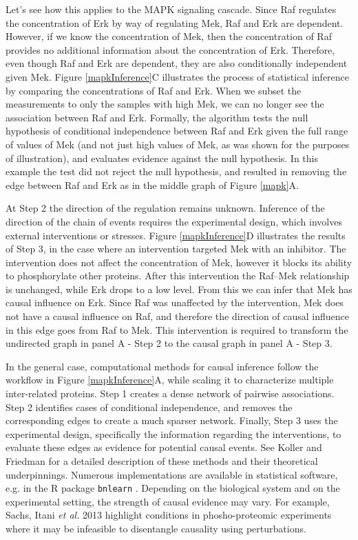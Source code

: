 \documentclass[journal=jacsat,manuscript=article]{achemso}
\def\added#1{{\color{blue} #1}}
\begin{document}
Let's see how this applies to the MAPK signaling cascade. \added{Since Raf regulates the concentration of Erk by way of regulating Mek, Raf and Erk are dependent.  However, if we know the concentration of Mek, then the concentration of Raf provides no additional information about the concentration of Erk. Therefore, even though Raf and Erk are dependent, they are also conditionally independent given Mek.  }  Figure \ref{mapkInference}C illustrates the process of statistical inference by comparing the concentrations of Raf and Erk. When we subset the measurements to only the samples with high Mek, we can no longer see the association between Raf and Erk. \added{Formally, the algorithm tests the null hypothesis of conditional independence between Raf and Erk given the full range of values of Mek (and not just high values of Mek, as was shown for the purposes of illustration), and evaluates evidence against the null hypothesis\cite{spirtes2000causation}. In this example the test did not reject the null hypothesis, and resulted in removing the edge between Raf and Erk as in the middle graph of Figure \ref{mapk}A. }

At Step 2 the direction of the regulation remains unknown. Inference of the direction of the chain of events requires the experimental design, which involves external interventions or stresses. Figure \ref{mapkInference}D illustrates the results of Step 3, in the case where an intervention targeted Mek with an inhibitor. The intervention does not affect the concentration of Mek, however it blocks its ability to phosphorylate other proteins.  After this intervention the Raf--Mek relationship is unchanged, while Erk drops to a low level.  From this we can infer that Mek has causal influence on Erk. Since Raf was unaffected by the intervention, Mek does not have a causal influence on Raf, and therefore the direction of causal influence in this edge goes from Raf to Mek.  This intervention is required to transform the undirected graph in panel A - Step 2 to the causal graph in panel A - Step 3.

In the general case, computational methods for causal inference follow the workflow in Figure \ref{mapkInference}A, while scaling it to characterize multiple inter-related proteins. Step 1 creates a dense network of pairwise associations. \added{Step 2 identifies cases of conditional independence, and removes the corresponding edges to create a much sparser network.}  Finally, Step 3 uses the experimental design, specifically the information regarding the interventions, to evaluate these edges as evidence for potential causal events. See Koller and Friedman \cite{koller2009probabilistic} for a detailed description of these methods and their theoretical underpinnings. Numerous implementations are available in statistical software, e.g. in the R package {\tt bnlearn} \cite{scutari2009learning}. \added{Depending on the biological system and on the experimental setting, the strength of causal evidence may vary. For example, Sachs, Itani {\it et al.} 2013\cite{sachs2013single} highlight conditions in phosho-proteomic experiments  where it may be infeasible to disentangle causality using perturbations.} 
\end{document}
